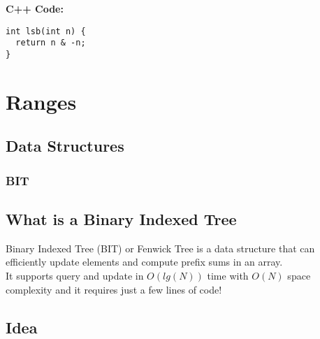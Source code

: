 \documentclass[twoside]{article}
\begin{document}
\textbf{C++ Code:}\\

\begin{verbatim}
int lsb(int n) {
  return n & -n;
}
\end{verbatim}
\begin{multicols*}{2}
\end{multicols*}
\sectionfont{\bfseries\sffamily\centering\Huge}
\vspace{1em}
\section*{Ranges}
\vspace{3em}
\subsectionfont{\bfseries\sffamily\centering\LARGE}
\vspace{0em}
\subsection*{Data Structures}
\vspace{2em}
\subsubsectionfont{\large\bfseries\sffamily\underline}
\subsubsection*{BIT}
\subsection{What is a Binary Indexed Tree}

Binary Indexed Tree (BIT) or Fenwick Tree is a data structure that can efficiently update
elements and compute prefix sums in an array.\\

It supports query and update in $O(lg(N))$ time with $O(N)$ space complexity and it requires just a few lines of code!

\subsection{Idea}



\begin{multicols*}{2}

\end{multicols*}
\end{document}
